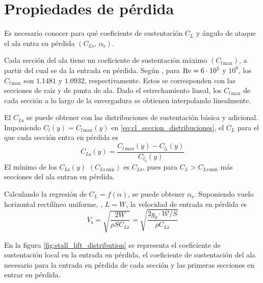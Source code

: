 
\section{Propiedades de pérdida}

Es necesario conocer para qué coeficiente de sustentación $C_L$ y ángulo de ataque el ala entra en pérdida $\left( C_{L\text{s}}, \ \alpha_\text{s} \right)$. 

Cada sección del ala tiene un coeficiente de sustentación máximo $\left( C_{l\,\text{max}} \right)$, a partir del cual se da la entrada en pérdida. Según \cite{aerotools_1}, para $\mathrm{Re} = 6 \cdot 10^5$ y $10^6$, los $C_{l\,\text{max}}$ son $1.1481$ y $1.0932$, respectivamente. Estos se corresponden con las secciones de raíz y de punta de ala. Dado el estrechamiento lineal, los $C_{l\,\text{max}}$ de cada sección a lo largo de la envergadura se obtienen interpolando linealmente.

El $C_{L\text{s}}$ se puede obtener con las distribuciones de sustentación básica y adicional. Imponiendo $C_l(y) = C_{l\,\text{max}}(y)$ en \eqref{eq:cl_seccion_distribuciones}, el $C_L$ para el que cada sección entra en pérdida es
\begin{equation}
    C_{L\text{s}}(y) = \frac{C_{l\,\text{max}}(y) - C_{l_b}(y)}{C_{l_a}(y)}
\end{equation}
El mínimo de los $C_{L\text{s}}(y)$ $\left( C_{L\text{s} \, \text{min}} \right)$ es $C_{L\text{s}}$, pues para $C_L > C_{L\text{s} \, \text{min}}$ más secciones del ala entran en pérdida.

Calculando la regresión de $C_L = f (\alpha)$, se puede obtener $\alpha_\text{s}$. Suponiendo vuelo horizontal rectilíneo uniforme, \ie, $L = W$, la velocidad de entrada en pérdida es
\begin{equation}
    V_\text{s} = \sqrt{\frac{2 W}{\rho S C_{L\text{s}}}} = 
    \sqrt{\frac{2 g_0 \cdot \mathcal{W}/S}{\rho C_{L\text{s}}}}
\end{equation}

En la figura \ref{fig:stall_lift_distribution} se representa el coeficiente de sustentación local en la entrada en pérdida, el coeficiente de sustentación del ala necesario para la entrada en pérdida de cada sección y las primeras secciones en entrar en pérdida.

